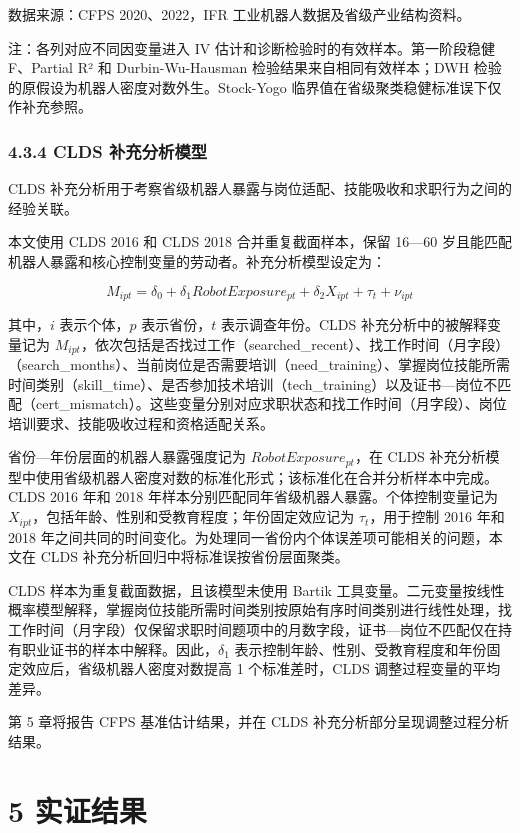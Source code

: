数据来源：CFPS 2020、2022，IFR 工业机器人数据及省级产业结构资料。

注：各列对应不同因变量进入 IV 估计和诊断检验时的有效样本。第一阶段稳健 F、Partial R² 和 Durbin-Wu-Hausman 检验结果来自相同有效样本；DWH 检验的原假设为机器人密度对数外生。Stock-Yogo 临界值在省级聚类稳健标准误下仅作补充参照。

\subsubsection{4.3.4 CLDS 补充分析模型}\label{clds-ux8865ux5145ux5206ux6790ux6a21ux578b}

CLDS 补充分析用于考察省级机器人暴露与岗位适配、技能吸收和求职行为之间的经验关联。

本文使用 CLDS 2016 和 CLDS 2018 合并重复截面样本，保留 16---60 岁且能匹配机器人暴露和核心控制变量的劳动者。补充分析模型设定为：

\[M_{ipt} = \delta_{0} + \delta_{1}RobotExposure_{pt} + \delta_{2}X_{ipt} + \tau_{t} + \nu_{ipt}\]

其中，\(i\) 表示个体，\(p\) 表示省份，\(t\) 表示调查年份。CLDS 补充分析中的被解释变量记为 \(M_{ipt}\)，依次包括是否找过工作（searched\_recent）、找工作时间（月字段）（search\_months）、当前岗位是否需要培训（need\_training）、掌握岗位技能所需时间类别（skill\_time）、是否参加技术培训（tech\_training）以及证书---岗位不匹配（cert\_mismatch）。这些变量分别对应求职状态和找工作时间（月字段）、岗位培训要求、技能吸收过程和资格适配关系。

省份---年份层面的机器人暴露强度记为 \(RobotExposure_{pt}\)，在 CLDS 补充分析模型中使用省级机器人密度对数的标准化形式；该标准化在合并分析样本中完成。CLDS 2016 年和 2018 年样本分别匹配同年省级机器人暴露。个体控制变量记为 \(X_{ipt}\)，包括年龄、性别和受教育程度；年份固定效应记为 \(\tau_{t}\)，用于控制 2016 年和 2018 年之间共同的时间变化。为处理同一省份内个体误差项可能相关的问题，本文在 CLDS 补充分析回归中将标准误按省份层面聚类。

CLDS 样本为重复截面数据，且该模型未使用 Bartik 工具变量。二元变量按线性概率模型解释，掌握岗位技能所需时间类别按原始有序时间类别进行线性处理，找工作时间（月字段）仅保留求职时间题项中的月数字段，证书---岗位不匹配仅在持有职业证书的样本中解释。因此，\(\delta_{1}\) 表示控制年龄、性别、受教育程度和年份固定效应后，省级机器人密度对数提高 1 个标准差时，CLDS 调整过程变量的平均差异。

第 5 章将报告 CFPS 基准估计结果，并在 CLDS 补充分析部分呈现调整过程分析结果。

\section{5 实证结果}\label{ux5b9eux8bc1ux7ed3ux679c}

